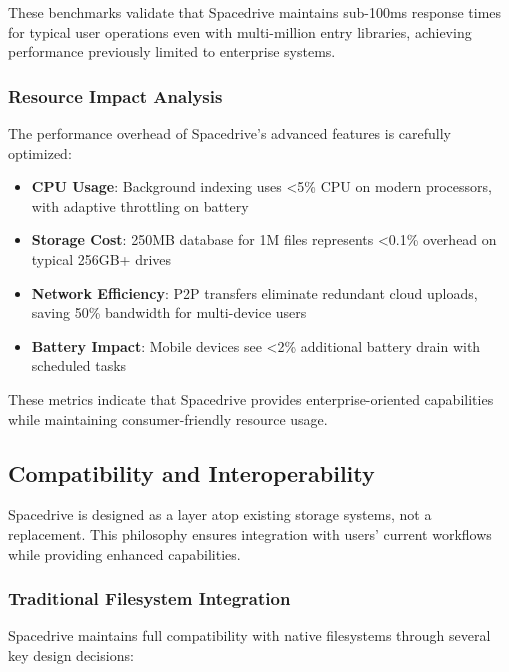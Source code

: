 \documentclass[sigconf]{acmart}
\begin{document}
These benchmarks validate that Spacedrive maintains sub-100ms response times for typical user operations even with multi-million entry libraries, achieving performance previously limited to enterprise systems.


\subsubsection{Resource Impact Analysis}
The performance overhead of Spacedrive's advanced features is carefully optimized:

\begin{itemize}[noitemsep, topsep=0pt]
\item \textbf{CPU Usage}: Background indexing uses <5\% CPU on modern processors, with adaptive throttling on battery
\item \textbf{Storage Cost}: 250MB database for 1M files represents <0.1\% overhead on typical 256GB+ drives
\item \textbf{Network Efficiency}: P2P transfers eliminate redundant cloud uploads, saving 50\% bandwidth for multi-device users
\item \textbf{Battery Impact}: Mobile devices see <2\% additional battery drain with scheduled tasks
\end{itemize}

These metrics indicate that Spacedrive provides enterprise-oriented capabilities while maintaining consumer-friendly resource usage.

\subsection{Compatibility and Interoperability}
Spacedrive is designed as a layer atop existing storage systems, not a replacement. This philosophy ensures integration with users' current workflows while providing enhanced capabilities.

\subsubsection{Traditional Filesystem Integration}
Spacedrive maintains full compatibility with native filesystems through several key design decisions:
\end{document}
